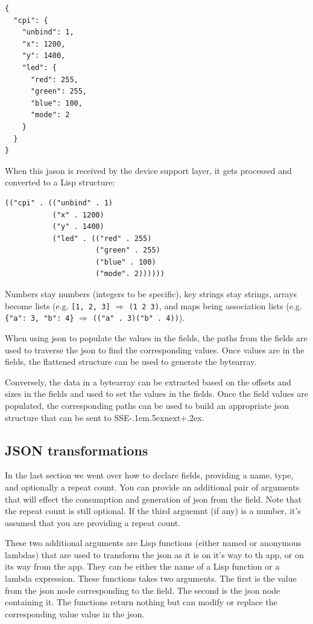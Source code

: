 \documentclass[12pt]{article}
\def\SSEnext{SSE\kern-.1em\lower.5ex\hbox{\footnotesize next}\kern+.2ex}
\begin{document}
\begin{verbatim}
{
  "cpi": {
    "unbind": 1,
    "x": 1200,
    "y": 1400,
    "led": {
      "red": 255,
      "green": 255,
      "blue": 100,
      "mode": 2
    }
  }
}
\end{verbatim}

When this jason is received by the device support layer, it gets
processed and converted to a Lisp structure: 

\begin{verbatim}
(("cpi" . (("unbind" . 1)
           ("x" . 1200)
           ("y" . 1400)
           ("led" . (("red" . 255)
                     ("green" . 255)
                     ("blue" . 100)
                     ("mode". 2))))))
\end{verbatim}

Numbers stay numbers (integers to be specific), key strings stay
strings, arrays become lists (e.g. \verb|[1, 2, 3]| $\Rightarrow$
\verb|(1 2 3)|, and maps being association lists (e.g.
\verb|{"a": 3, "b": 4}| $\Rightarrow$ \verb|(("a" . 3)("b" . 4))|).

When using json to populate the values in the fields, the paths from
the fields are used to traverse the json to find the corresponding
values. Once values are in the fields, the flattened structure can be
used to generate the bytearray. 

Conversely, the data in a bytearray can be extracted based on the
offsets and sizes in the fields and used to set the values in the
fields. Once the field values are populated, the corresponding paths
can be used to build an appropriate json structure that can be sent to
\SSEnext. 

\subsection{JSON transformations}

In the last section we went over how to declare fields, providing a
name, type, and optionally a repeat count. You can provide an
additional pair of arguments that will effect the consumption and
generation of json from the field. Note that the repeat count is still
optional. If the third arguemnt (if any) is a number, it's assumed
that you are providing a repeat count.

These two additional arguments are Lisp functions (either named or
anonymous lambdas) that are used to transform the json as it is on
it's way to th app, or on its way from the app. They can be either the name of a Lisp
function or a lambda expression. These functions takes two arguments. The first is the value from the json node
corresponding to the field. The second is the json node containing it.
The functions return nothing but can modify or replace the
corresponding value value in the json.
\end{document}
